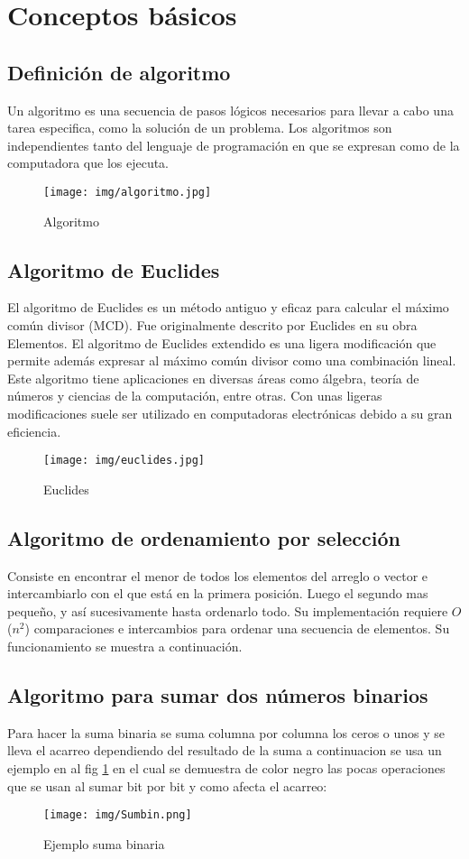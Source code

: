 \documentclass[12pt,twoside]{article}
\begin{document}
\section{Conceptos básicos}
\subsection*{Definición de algoritmo}
Un algoritmo es una secuencia de pasos lógicos necesarios para llevar a cabo una tarea especifica, como la solución de un problema. Los algoritmos son independientes tanto del lenguaje de programación en que se expresan como de la computadora que los ejecuta.
\vspace{10 mm}
\begin{figure}[H]
\centering
\texttt{[image: img/algoritmo.jpg]}
\caption{Algoritmo}
\end{figure}
\subsection*{Algoritmo de Euclides}
El algoritmo de Euclides es un método antiguo y eficaz para calcular el máximo común divisor (MCD). Fue originalmente descrito por Euclides en su obra Elementos. El algoritmo de Euclides extendido es una ligera modificación que permite además expresar al máximo común divisor como una combinación lineal. Este algoritmo tiene aplicaciones en diversas áreas como álgebra, teoría de números y ciencias de la computación, entre otras. Con unas ligeras modificaciones suele ser utilizado en computadoras electrónicas debido a su gran eficiencia.
\begin{figure}[H]
\centering
\texttt{[image: img/euclides.jpg]}
\caption{Euclides}
\end{figure}
\subsection*{Algoritmo de ordenamiento por selección}
Consiste en encontrar el menor de todos los elementos del arreglo o vector e intercambiarlo con el que está en la primera posición. Luego el segundo mas pequeño, y así sucesivamente hasta ordenarlo todo. Su implementación requiere $O$($n^2$) comparaciones e intercambios para ordenar una secuencia de elementos. Su funcionamiento se muestra a continuación.

\subsection*{Algoritmo para sumar dos números binarios}
Para hacer la suma binaria se suma columna por columna los ceros o unos y se lleva el acarreo dependiendo del resultado de la suma a continuacion se usa un ejemplo en al fig \ref{sumbinaria} en el cual se demuestra de color negro las pocas operaciones que se usan al sumar bit por bit y como afecta el acarreo: 
\vspace{10 mm}
\begin{figure}[H]
\centering
\texttt{[image: img/Sumbin.png]}
\caption{Ejemplo suma binaria}
\label{sumbinaria}
\end{figure}
\end{document}
